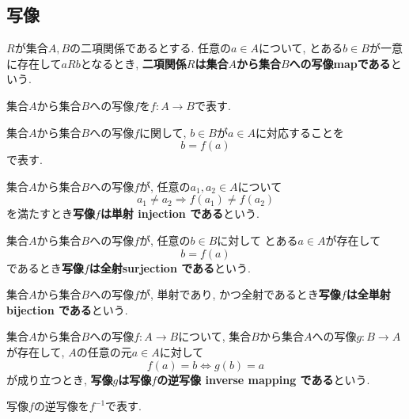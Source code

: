 \subsection{写像}
\begin{Def}
$R$が集合$A,B$の二項関係であるとする.
任意の$a\in A$について, とある$b\in B$が一意に存在して$aRb$となるとき,
{\bf 二項関係$R$は集合$A$から集合$B$への写像mapである}という.
\end{Def}
\begin{Notation}
集合$A$から集合$B$への写像$f$を$f:A\rightarrow B$で表す.
\end{Notation}
\begin{comment}
\begin{caution}
以下では, 「{\bf 関数 function\index{かんすう@関数}}」と「写像」を同じ意味で用いる.
\end{caution}
\end{comment}
\begin{Notation}
集合$A$から集合$B$への写像$f$に関して, $b\in B$が$a\in A$に対応することを
\[
b=f(a)
\]
で表す.
\end{Notation}
\begin{Def}
集合$A$から集合$B$への写像$f$が,
任意の$a_1,a_2\in A$について
\[
a_1\neq a_2\Rightarrow f(a_1)\neq f(a_2)
\]
を満たすとき{\bf 写像$f$は単射 injection である}という.
\end{Def}
\begin{Def}
集合$A$から集合$B$への写像$f$が,
任意の$b\in B$に対して
とある$a\in A$が存在して
\[
b=f(a)
\]
であるとき{\bf 写像$f$は全射surjection である}という.
\end{Def}
\begin{Def}
集合$A$から集合$B$への写像$f$が, 単射であり, かつ全射であるとき{\bf 写像$f$は全単射 bijection である}という.
\end{Def}

\begin{Def}
集合$A$から集合$B$への写像$f:A\rightarrow B$について, 集合$B$から集合$A$への写像$g:B\rightarrow A$が存在して, $A$の任意の元$a\in A$に対して
\[
f(a)=b \Leftrightarrow g(b)=a
\]
が成り立つとき, {\bf 写像$g$は写像$f$の逆写像 inverse mapping である}という.
\end{Def}
\begin{Notation}
写像$f$の逆写像を$f^{-1}$で表す.
\end{Notation}
\begin{comment}
************************************
\begin{Def}
$R$が集合$A,B$の二項関係であるとする.

任意の$a\in A$について$b,b'\in B$が存在し,
\[
aRb\land aRb'\Rightarrow b=b'
\]
が成り立つとき, {\bf $R$は$A$から$B$への部分関数\index{ぶぶんかんすう@部分関数}}という.\footnote{ここいらない気がする}
\end{Def}
\begin{Prop}
関数は部分関数である. これは定義より明らかである.
\end{Prop}
\begin{Prop}
部分関数は二項関係である. これは定義より明らかである.
\end{Prop}
************************************
\end{comment}

